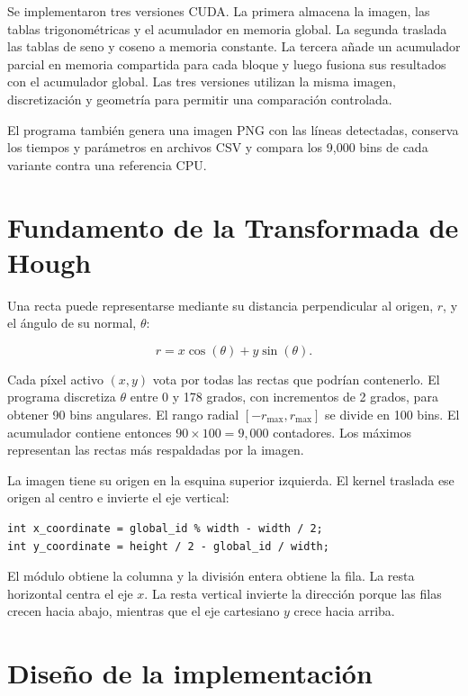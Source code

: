 \documentclass[12pt,letterpaper]{article}
\begin{document}
Se implementaron tres versiones CUDA. La primera almacena la imagen, las tablas trigonométricas y el acumulador en memoria global. La segunda traslada las tablas de seno y coseno a memoria constante. La tercera añade un acumulador parcial en memoria compartida para cada bloque y luego fusiona sus resultados con el acumulador global. Las tres versiones utilizan la misma imagen, discretización y geometría para permitir una comparación controlada.

El programa también genera una imagen PNG con las líneas detectadas, conserva los tiempos y parámetros en archivos CSV y compara los 9,000 bins de cada variante contra una referencia CPU.

\section{Fundamento de la Transformada de Hough}

Una recta puede representarse mediante su distancia perpendicular al origen, $r$, y el ángulo de su normal, $\theta$:

\begin{equation}
  r = x\cos(\theta) + y\sin(\theta).
  \label{eq:hough}
\end{equation}

Cada píxel activo $(x,y)$ vota por todas las rectas que podrían contenerlo. El programa discretiza $\theta$ entre 0 y 178 grados, con incrementos de 2 grados, para obtener 90 bins angulares. El rango radial $[-r_{\max},r_{\max}]$ se divide en 100 bins. El acumulador contiene entonces $90\times100=9{,}000$ contadores. Los máximos representan las rectas más respaldadas por la imagen.

La imagen tiene su origen en la esquina superior izquierda. El kernel traslada ese origen al centro e invierte el eje vertical:

\begin{lstlisting}
int x_coordinate = global_id % width - width / 2;
int y_coordinate = height / 2 - global_id / width;
\end{lstlisting}

El módulo obtiene la columna y la división entera obtiene la fila. La resta horizontal centra el eje $x$. La resta vertical invierte la dirección porque las filas crecen hacia abajo, mientras que el eje cartesiano $y$ crece hacia arriba.

\section{Diseño de la implementación}
\end{document}
